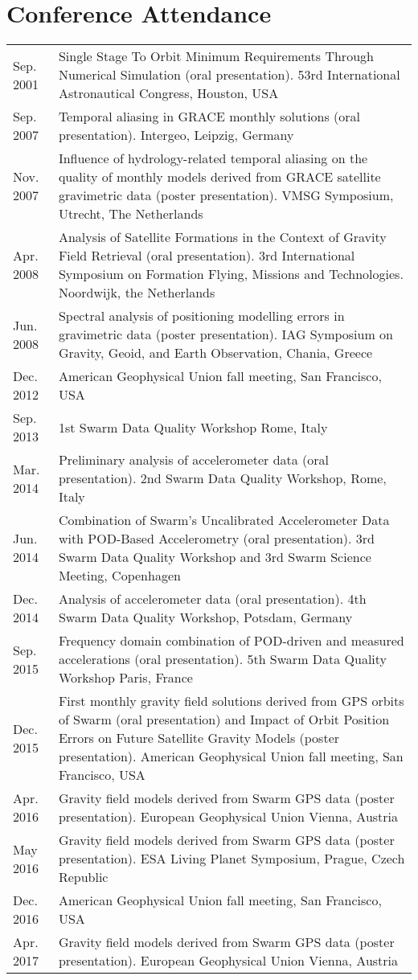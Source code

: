 \documentclass[a4paper]{article}
\newenvironment{cvsection}[2]{
  \setlength{\floatsep}{0pt}
  \setlength{\textfloatsep}{0pt}
  \setlength{\intextsep}{0pt}
  \section*{#1}
  \begin{longtable}{lp{#2}}
}{
  \end{longtable}
}
\begin{document}
\begin{cvsection}{Conference Attendance}{13cm}

Sep. 2001 & Single Stage To Orbit Minimum Requirements Through Numerical Simulation (oral presentation). 53rd International Astronautical Congress, Houston, USA \\
Sep. 2007 & Temporal aliasing in GRACE monthly solutions (oral presentation). Intergeo,  Leipzig, Germany\\
Nov. 2007 & Influence of hydrology-related temporal aliasing on the quality of monthly models derived from GRACE satellite gravimetric data (poster presentation). VMSG Symposium,  Utrecht, The Netherlands\\
Apr. 2008 & Analysis of Satellite Formations in the Context of Gravity Field Retrieval (oral presentation). 3rd International Symposium on Formation Flying, Missions and Technologies. Noordwijk, the Netherlands\\
Jun. 2008 & Spectral analysis of positioning modelling errors in gravimetric data (poster presentation). IAG Symposium on Gravity, Geoid, and Earth Observation, Chania, Greece\\
Dec. 2012 & American Geophysical Union fall meeting, San Francisco, USA\\
Sep. 2013 & 1st Swarm Data Quality Workshop Rome, Italy\\
Mar. 2014 & Preliminary analysis of accelerometer data (oral presentation). 2nd Swarm Data Quality Workshop, Rome, Italy\\
Jun. 2014 & Combination of Swarm's Uncalibrated Accelerometer Data with POD-Based Accelerometry (oral presentation). 3rd Swarm Data Quality Workshop and 3rd Swarm Science Meeting, Copenhagen\\
Dec. 2014 & Analysis of accelerometer data (oral presentation). 4th Swarm Data Quality Workshop, Potsdam, Germany\\
Sep. 2015 & Frequency domain combination of POD-driven and measured accelerations (oral presentation). 5th Swarm Data Quality Workshop  Paris, France\\
Dec. 2015 & First monthly gravity field solutions derived from GPS orbits of Swarm (oral presentation) and Impact of Orbit Position Errors on Future Satellite Gravity Models (poster presentation). American Geophysical Union fall meeting, San Francisco, USA\\
Apr. 2016 & Gravity field models derived from Swarm GPS data (poster presentation). European Geophysical Union Vienna, Austria\\
May 2016 & Gravity field models derived from Swarm GPS data (poster presentation). ESA Living Planet Symposium, Prague, Czech Republic\\
Dec. 2016 & American Geophysical Union fall meeting, San Francisco, USA\\
Apr. 2017 & Gravity field models derived from Swarm GPS data (poster presentation). European Geophysical Union Vienna, Austria\\

\end{cvsection}
\end{document}
